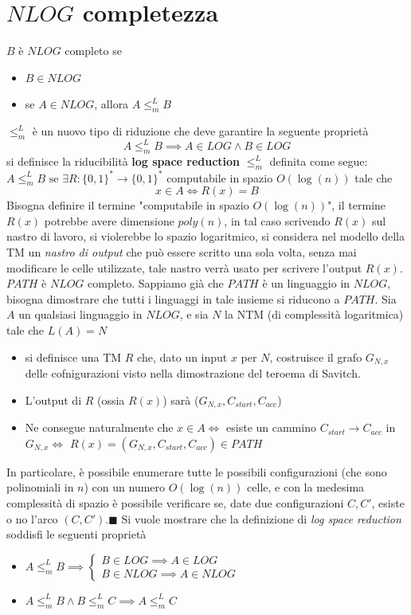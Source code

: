\documentclass[10pt, letterpaper]{report}
\begin{document}
\section{$NLOG$ completezza}
 $B$ è $NLOG$ completo se\begin{itemize}
    \item $B\in NLOG$
    \item se $A\in NLOG$, allora $A\le_m^L B$
\end{itemize}
$\le_m^L$ è un nuovo tipo di riduzione che deve garantire la seguente proprietà
$$ A\le_m^L B\implies A\in LOG \land B\in LOG$$
 si definisce la riducibilità \textbf{log space reduction} $\le_m^L$ definita come segue:\\  
$A\le_m^L B \text{ se }\exists R:\{0,1\}^*\rightarrow \{0,1\}^*$  computabile in spazio $O(\log(n))$ tale che 
$$ x\in A \iff R(x)=B$$
Bisogna definire il termine "computabile in spazio $O(\log(n))$", il termine $R(x)$ potrebbe avere dimensione $poly(n)$, in tal caso scrivendo $R(x)$ sul nastro di lavoro, si violerebbe lo spazio logaritmico, si considera nel modello della TM un \textit{nastro di output} che può essere scritto una sola volta, senza mai modificare le celle utilizzate, tale nastro verrà usato per scrivere l'output $R(x)$.\acc 
\teo{} $PATH$ è $NLOG$ completo.\acc 
\dimo{} Sappiamo già che $PATH$ è un linguaggio in $NLOG$, bisogna dimostrare che tutti i linguaggi in tale insieme si riducono a $PATH$. Sia $A$ un qualsiasi linguaggio in $NLOG$, e sia $N$ la NTM (di complessità logaritmica) tale che $L(A)=N$\begin{itemize} \item si definisce una TM $R$ che, dato un input $x$ per $N$, costruisce il grafo $G_{N,x}$ delle cofnigurazioni visto nella dimostrazione del teroema di Savitch. \item L'output di $R$ (ossia $R(x)$) sarà ($G_{N,x}, C_{start}, C_{acc}$) \item Ne consegue naturalmente che $x\in A \iff$ esiste un cammino $C_{start}\rightarrow C_{acc}$ in $G_{N,x}\iff$ $R(x)=(G_{N,x}, C_{start}, C_{acc})\in PATH$
\end{itemize}
In particolare, è possibile enumerare tutte le possibili configurazioni (che sono polinomiali in $n$) con un numero $O(\log(n))$ celle, e con la medesima complessità di spazio è possibile verificare se, date due configurazioni $C,C'$, esiste o no l'arco $(C,C')$.\hfill$\blacksquare$\acc 
Si vuole mostrare che la definizione di \textit{log space reduction} soddisfi le seguenti proprietà\begin{itemize}
    \item $A\le_m^L B \implies \begin{cases}
        B\in LOG \implies A\in LOG\\ 
        B\in NLOG \implies A\in NLOG
    \end{cases}$
    \item $A\le_m^L B \land B \le_m^L C \implies A \le_m^L C$
\end{itemize}
\end{document}

